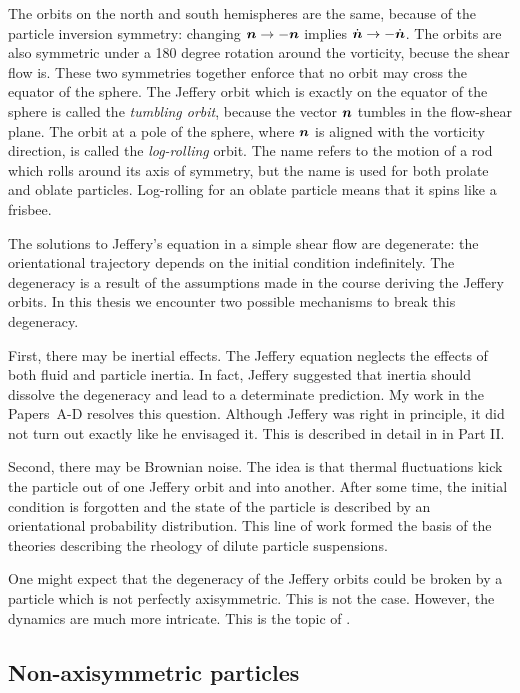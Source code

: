 \documentclass[thesis.tex]{subfiles}
\begin{document}
The orbits on the north and south hemispheres are the same, because of the particle inversion symmetry: changing $\mbox{\boldmath$n$} \to -\mbox{\boldmath$n$}$ implies $\dot{\mbox{\boldmath$n$}} \to - \dot{\mbox{\boldmath$n$}}$. The orbits are also symmetric under a 180 degree rotation around the vorticity, becuse the shear flow is. These two symmetries together enforce that no orbit may cross the equator of the sphere. The Jeffery orbit which is exactly on the equator of the sphere is called the \emph{tumbling orbit}, because the vector $\mbox{\boldmath$n$}$ tumbles in the flow-shear plane. The orbit at a pole of the sphere, where $\mbox{\boldmath$n$}$ is aligned with the vorticity direction, is called the \emph{log-rolling} orbit. The name refers to the motion of a rod which rolls around its axis of symmetry, but the name is used for both prolate and oblate particles. Log-rolling for an oblate particle means that it spins like a frisbee.

The solutions to Jeffery's equation in a simple shear flow are degenerate: the orientational trajectory depends on the initial condition indefinitely. The degeneracy is a result of the assumptions made in the course deriving the Jeffery orbits. In this thesis we encounter two possible mechanisms to break this degeneracy.

First, there may be inertial effects. The Jeffery equation neglects the effects of both fluid and particle inertia. In fact, Jeffery suggested that inertia should dissolve the degeneracy and lead to a determinate prediction. My work in the Papers~A-D resolves this question. Although Jeffery was right in principle, it did not turn out exactly like he envisaged it. This is described in detail in  in Part II.

Second, there may be Brownian noise. The idea is that thermal fluctuations kick the particle out of one Jeffery orbit and into another. After some time, the initial condition is forgotten and the state of the particle is described by an orientational probability distribution. This line of work formed the basis of the theories describing the rheology of dilute particle suspensions.

One might expect that the degeneracy of the Jeffery orbits could be broken by a particle which is not perfectly axisymmetric. This is not the case. However, the dynamics are much more intricate. This is the topic of .


\subsection{Non-axisymmetric particles}
\end{document}

